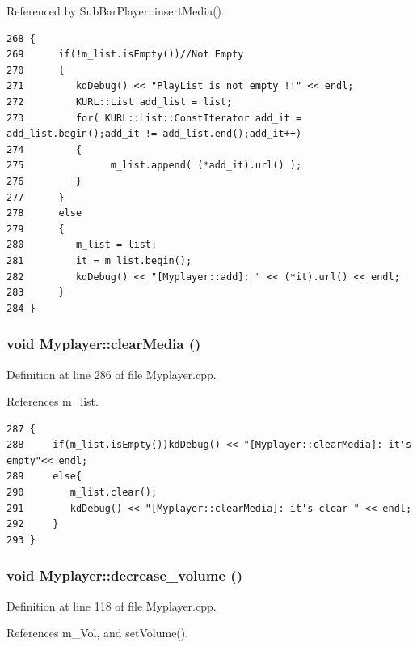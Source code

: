 Referenced by Sub\-Bar\-Player::insert\-Media().



\footnotesize\begin{verbatim}268 {     
269      if(!m_list.isEmpty())//Not Empty
270      {
271         kdDebug() << "PlayList is not empty !!" << endl;
272         KURL::List add_list = list;
273         for( KURL::List::ConstIterator add_it = add_list.begin();add_it != add_list.end();add_it++)
274         {
275               m_list.append( (*add_it).url() );
276         }       
277      }
278      else
279      {
280         m_list = list;
281         it = m_list.begin();
282         kdDebug() << "[Myplayer::add]: " << (*it).url() << endl;
283      }
284 }
\end{verbatim}\normalsize 
{}
\subsubsection{\setlength{\rightskip}{0pt plus 5cm}void Myplayer::clear\-Media ()\hspace{0.3cm}{\tt  [slot]}}\label{classMyplayer_Myplayeri18}




Definition at line 286 of file Myplayer.cpp.

References m\_\-list.



\footnotesize\begin{verbatim}287 {    
288     if(m_list.isEmpty())kdDebug() << "[Myplayer::clearMedia]: it's empty"<< endl;
289     else{
290        m_list.clear();     
291        kdDebug() << "[Myplayer::clearMedia]: it's clear " << endl;      
292     }
293 }
\end{verbatim}\normalsize 
{}
\subsubsection{\setlength{\rightskip}{0pt plus 5cm}void Myplayer::decrease\_\-volume ()\hspace{0.3cm}{\tt  [slot]}}\label{classMyplayer_Myplayeri7}




Definition at line 118 of file Myplayer.cpp.

References m\_\-Vol, and set\-Volume().



